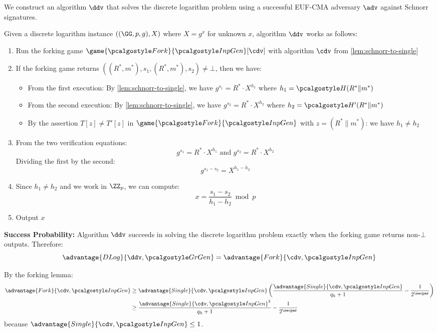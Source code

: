 \ifsolutions
\begin{mysolution}
  We construct an algorithm $\ddv$ that solves the discrete logarithm problem using a successful EUF-CMA adversary $\adv$ against Schnorr signatures.
  
  Given a discrete logarithm instance $((\GG, p, g), X)$ where $X = g^x$ for unknown $x$, algorithm $\ddv$ works as follows:
  \begin{enumerate}
    \item Run the forking game $\game{\algo{Fork}}{\algo{InpGen}}[\cdv]$ with algorithm $\cdv$ from \autoref{lem:schnorr-to-single}
    \item If the forking game returns $((R^*, m^*), s_1, (R^*, m^*), s_2) \neq \bot$, then we have:
    \begin{itemize}
      \item From the first execution: By \autoref{lem:schnorr-to-single}, we have $g^{s_1} = R^* \cdot X^{h_1}$ where $h_1 = \algo{H}(R^* \| m^*)$
      \item From the second execution: By \autoref{lem:schnorr-to-single}, we have $g^{s_2} = R^* \cdot X^{h_2}$ where $h_2 = \algo{H}'(R^* \| m^*)$
      \item By the assertion $T[z] \neq T'[z]$ in $\game{\algo{Fork}}{\algo{InpGen}}$ with $z = (R^* \| m^*)$: we have $h_1 \neq h_2$
    \end{itemize}
    \item From the two verification equations:
    \[
      g^{s_1} = R^* \cdot X^{h_1} \text{ and } g^{s_2} = R^* \cdot X^{h_2}
    \]
    Dividing the first by the second:
    \[
      g^{s_1 - s_2} = X^{h_1 - h_2}
    \]
    \item Since $h_1 \neq h_2$ and we work in $\ZZ_p$, we can compute:
    \[
      x = \frac{s_1 - s_2}{h_1 - h_2} \bmod p
    \]
    \item Output $x$
  \end{enumerate}
  
  \textbf{Success Probability:} Algorithm $\ddv$ succeeds in solving the discrete logarithm problem exactly when the forking game returns non-$\bot$ outputs. Therefore:
  \[
    \advantage{DLog}{\ddv, \grgen} = \advantage{Fork}{\cdv, \algo{InpGen}}
  \]
  
  By the forking lemma:
  \begin{align*}
    \advantage{Fork}{\cdv, \algo{InpGen}} &\geq \advantage{Single}{\cdv, \algo{InpGen}} \left( \frac{\advantage{Single}{\cdv, \algo{InpGen}}}{q_h + 1} - \frac{1}{2^\secpar} \right)\\
    &\geq  \frac{\advantage{Single}{\cdv, \algo{InpGen}}^2}{q_h + 1} - \frac{1}{2^\secpar}\\
  \end{align*}
  because $\advantage{Single}{\cdv, \algo{InpGen}} \leq 1$.
  

\end{mysolution}
